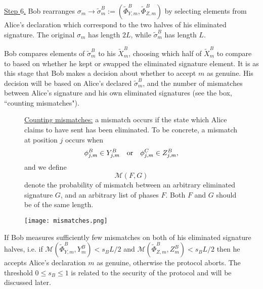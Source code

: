 \noindent \underline{Step $6$.} Bob rearranges $\sigma_m \rightarrow \tilde{\sigma}_m^B := \left(\tilde{\Phi}_{Y, m}^B, \tilde{\Phi}_{Z, m}^B\right)$ by selecting elements from Alice's declaration which correspond to the two halves of his eliminated signature. The original $\sigma_m$ has length $2 L$, while $\tilde{\sigma}_m^B$ has length $L$.

Bob compares elements of $\tilde{\sigma}_m^B$ to his $\tilde{X}_m^{B}$, choosing which half of $\tilde{X}_m^B$ to compare to based on whether he kept or swapped the eliminated signature element. It is as this stage that Bob makes a decision about whether to accept $m$ as genuine. His decision will be based on Alice's declared $\tilde{\sigma}_m^B$, and the number of mismatches between Alice's signature and his own eliminated signatures (see the box, ``counting mismatches").

\begin{figure}[htp]
\captionsetup{width=0.8\linewidth}
\begin{framed}
\noindent \underline{Counting mismatches:} a mismatch occurs if the state which Alice claims to have sent has been eliminated. To be concrete, a mismatch at position $j$ occurs when
\begin{equation}
\phi_{j, m}^B \in Y_{j, m}^B \qq{or} \phi_{j, m}^C \in Z_{j, m}^B, 
\end{equation}
and we define
\begin{equation}
\mathcal{M}\left(F, G\right)
\end{equation}
denote the probability of mismatch between an arbitrary eliminated signature $G$, and an arbitrary list of phases $F$. Both $F$ and $G$ should be of the same length.


\end{framed}
\end{figure}

\begin{figure}[htp]
\centering
\texttt{[image: mismatches.png]}
\caption{\label{fig:qds_mismatches}}
\end{figure}

If Bob measures sufficiently few mismatches on both of his eliminated signature halves, i.e. if $\mathcal{M}\left(\tilde{\Phi}_{Y, m}^B, Y_m^B\right) < s_B L/2$ and $\mathcal{M}\left(\tilde{\Phi}_{Z,m}^B, Z_m^B\right) < s_B L/2$ then he accepts Alice's declaration $m$ as genuine, otherwise the protocol aborts. The threshold $0 \le s_B \le 1$ is related to the security of the protocol and will be discussed later.

